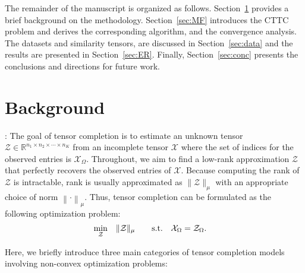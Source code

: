 \documentclass{article}
\newcommand{\T}{\mathcal}
\newcommand{\m}[1]{{\bf{#1}}}
\begin{document}
The remainder of the manuscript is organized as follows. Section~\ref{sec:BG} provides a brief background on the methodology. Section~\ref{sec:MF} introduces the CTTC problem and derives the corresponding algorithm, and the convergence analysis. The datasets and similarity tensors, are discussed in Section~\ref{sec:data} and the results are presented in Section~\ref{sec:ER}. Finally, Section~\ref{sec:conc} presents the conclusions and directions for future work.



\section{Background}\label{sec:BG}

:
The goal of tensor completion is to estimate an unknown tensor ${\T{Z}} \in \mathbb R^{n_1\times n_2\times \cdots \times n_K}$ from an incomplete tensor $\T X$ where the set of indices for the observed entries is $ {\T X}_\Omega$. Throughout, we aim to find a low-rank approximation $\T Z$ that perfectly recovers the observed entries of $\T X$. Because computing the rank of $\T Z$ is intractable, rank is usually approximated as $\|\T{Z}\|_{\mu}$ with an appropriate choice of norm $\left\|\cdot\right\|_{\mu}$. Thus, tensor completion can be formulated as the following optimization problem: 
\begin{equation}
\label{eq:1}
\begin{aligned}
\min\limits_{ \T{Z} }&\quad \|\T{Z}\|_{\mu}\qquad 
\textrm{s.t.} \quad \m {\T X}_\Omega = {\T{Z}}_\Omega. 
\end{aligned}
\end{equation}

Here, we briefly introduce three main categories of tensor completion models involving non-convex optimization
problems:\\ 
\end{document}
